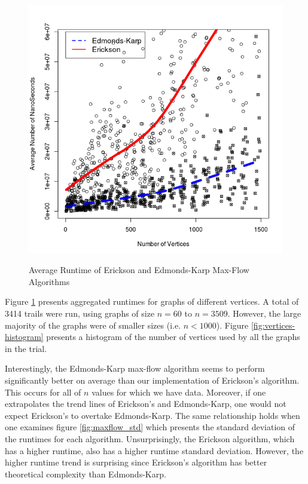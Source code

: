 \documentclass[12pt]{article}
\begin{document}
\begin{figure}[h!]
\caption{Average Runtime of Erickson and Edmonds-Karp Max-Flow Algorithms}
\centering
\includegraphics[width=5in]{maxflow_results_avg.png}
\label{fig:maxflow_avg}
\end{figure}

Figure \ref{fig:maxflow_avg} presents aggregated runtimes for graphs of different vertices. A total of 3414 trails were run, using graphs of size $n = 60$ to $n=3509$. However, the large majority of the graphs were of smaller sizes (i.e. $n < 1000$). Figure \ref{fig:vertices-histogram} presents a histogram of the number of vertices used by all the graphs in the trial. 

Interestingly, the Edmonds-Karp max-flow algorithm seems to perform significantly better on average than our implementation of Erickson's algorithm. This occurs for all of $n$ values for which we have data. Moreover, if one extrapolates the trend lines of Erickson's and Edmonds-Karp, one would not expect Erickson's to overtake Edmonds-Karp. The same relationship holds when one examines figure \ref{fig:maxflow_std} which presents the standard deviation of the runtimes for each algorithm. Unsurprisingly, the Erickson algorithm, which has a higher runtime, also has a higher runtime standard deviation. However, the higher runtime trend is surprising since Erickson's algorithm has better theoretical complexity than Edmonds-Karp.
\end{document}
